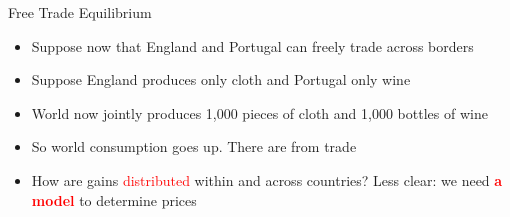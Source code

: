 \documentclass[10pt,hyperref={CJKbookmarks=true},xcolor=dvipsnames,aspectratio=169]{beamer}
\begin{document}
\begin{frame}{Free Trade Equilibrium }

\begin{itemize}
\item Suppose now that England and Portugal can freely trade across borders
\item Suppose England produces only cloth and Portugal only wine 
\item World now jointly produces 1,000 pieces of cloth and 1,000 bottles
of wine 
\item So world consumption goes up. There are  from trade 

\item How are gains \textcolor{red}{distributed} within and across countries?
Less clear: we need \textbf{\textcolor{red}{a model}} to determine
prices
\end{itemize}
\end{frame}
\end{document}
